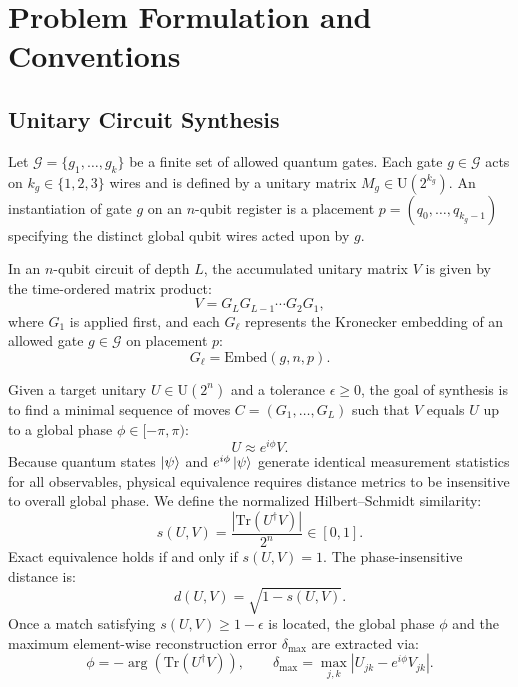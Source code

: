 \documentclass[11pt]{article}
\newcommand{\Tr}{\mathrm{Tr}}
\begin{document}
\section{Problem Formulation and Conventions}
\subsection{Unitary Circuit Synthesis}
Let $\mathcal{G} = \{g_1, \dots, g_k\}$ be a finite set of allowed quantum gates. Each gate $g \in \mathcal{G}$ acts on $k_g \in \{1, 2, 3\}$ wires and is defined by a unitary matrix $M_g \in \mathrm{U}(2^{k_g})$. An instantiation of gate $g$ on an $n$-qubit register is a placement $p = (q_0, \dots, q_{k_g-1})$ specifying the distinct global qubit wires acted upon by $g$.

In an $n$-qubit circuit of depth $L$, the accumulated unitary matrix $V$ is given by the time-ordered matrix product:
\begin{equation}
    V = G_L G_{L-1} \cdots G_2 G_1,
    \label{eq:circuit_product}
\end{equation}
where $G_1$ is applied first, and each $G_\ell$ represents the Kronecker embedding of an allowed gate $g \in \mathcal{G}$ on placement $p$:
\begin{equation}
    G_\ell = \mathrm{Embed}(g, n, p).
\end{equation}

Given a target unitary $U \in \mathrm{U}(2^n)$ and a tolerance $\epsilon \ge 0$, the goal of synthesis is to find a minimal sequence of moves $C = (G_1, \dots, G_L)$ such that $V$ equals $U$ up to a global phase $\phi \in [-\pi, \pi)$:
\begin{equation}
    U \approx e^{i\phi} V.
\end{equation}
Because quantum states $\ket{\psi}$ and $e^{i\phi}\ket{\psi}$ generate identical measurement statistics for all observables, physical equivalence requires distance metrics to be insensitive to overall global phase. We define the normalized Hilbert--Schmidt similarity:
\begin{equation}
    s(U, V) = \frac{|\Tr(U^\dagger V)|}{2^n} \in [0, 1].
    \label{eq:similarity}
\end{equation}
Exact equivalence holds if and only if $s(U, V) = 1$. The phase-insensitive distance is:
\begin{equation}
    d(U, V) = \sqrt{1 - s(U, V)}.
    \label{eq:distance}
\end{equation}
Once a match satisfying $s(U, V) \ge 1 - \epsilon$ is located, the global phase $\phi$ and the maximum element-wise reconstruction error $\delta_{\max}$ are extracted via:
\begin{equation}
    \phi = -\arg(\Tr(U^\dagger V)), \qquad \delta_{\max} = \max_{j, k} \left| U_{jk} - e^{i\phi} V_{jk} \right|.
    \label{eq:verify}
\end{equation}
\end{document}
